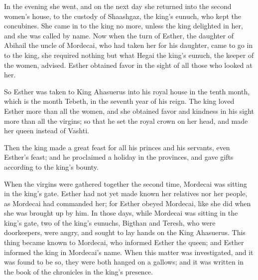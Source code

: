 {In the evening she went, and on the next day she returned into the second women’s house, to the custody of Shaashgaz, the king’s eunuch, who kept the concubines. She came in to the king no more, unless the king delighted in her, and she was called by name.
Now when the turn of Esther, the daughter of Abihail the uncle of Mordecai, who had taken her for his daughter, came to go in to the king, she required nothing but what Hegai the king’s eunuch, the keeper of the women, advised. Esther obtained favor in the sight of all those who looked at her.
\par }{\PP {}So Esther was taken to King Ahasuerus into his royal house in the tenth month, which is the month Tebeth, in the seventh year of his reign.
The king loved Esther more than all the women, and she obtained favor and kindness in his sight more than all the virgins; so that he set the royal crown on her head, and made her queen instead of Vashti.
\par }{\PP {}Then the king made a great feast for all his princes and his servants, even Esther’s feast; and he proclaimed a holiday in the provinces, and gave gifts according to the king’s bounty.
\par }{\PP {}When the virgins were gathered together the second time, Mordecai was sitting in the king’s gate.
Esther had not yet made known her relatives nor her people, as Mordecai had commanded her; for Esther obeyed Mordecai, like she did when she was brought up by him.
In those days, while Mordecai was sitting in the king’s gate, two of the king’s eunuchs, Bigthan and Teresh, who were doorkeepers, were angry, and sought to lay hands on the King Ahasuerus.
This thing became known to Mordecai, who informed Esther the queen; and Esther informed the king in Mordecai’s name.
When this matter was investigated, and it was found to be so, they were both hanged on a gallows; and it was written in the book of the chronicles in the king’s presence.

}

